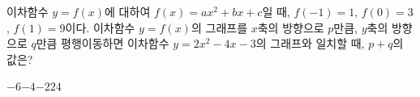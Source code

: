 이차함수 $y=f(x)$에 대하여 $f(x)=ax^2+bx+c$일 때, $f(-1)=1$, $f(0)=3$, $f(1)=9$이다. 이차함수 $y=f(x)$의 그래프를 $x$축의 방향으로 $p$만큼, $y$축의 방향으로 $q$만큼 평행이동하면 이차함수 $y=2x^2-4x-3$의 그래프와 일치할 때, $p+q$의 값은? 
\begin{choices32}{$-6$}{$-4$}{$-2$}{$2$}{$4$}\end{choices32}
